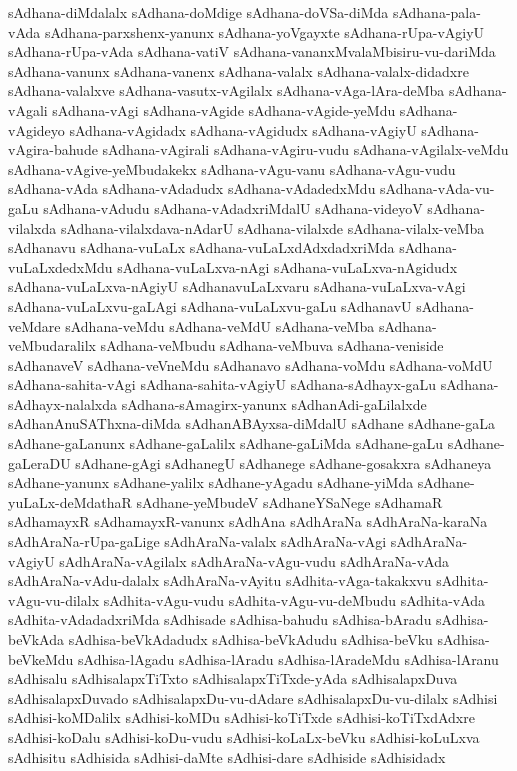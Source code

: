 {sAdhana-diMdalalx
sAdhana-doMdige
sAdhana-doVSa-diMda
sAdhana-pala-vAda
sAdhana-parxshenx-yanunx
sAdhana-yoVgayxte
sAdhana-rUpa-vAgiyU
sAdhana-rUpa-vAda
sAdhana-vatiV
sAdhana-vananxMvalaMbisiru-vu-dariMda
sAdhana-vanunx
sAdhana-vanenx
sAdhana-valalx
sAdhana-valalx-didadxre
sAdhana-valalxve
sAdhana-vasutx-vAgilalx
sAdhana-vAga-lAra-deMba
sAdhana-vAgali
sAdhana-vAgi
sAdhana-vAgide
sAdhana-vAgide-yeMdu
sAdhana-vAgideyo
sAdhana-vAgidadx
sAdhana-vAgidudx
sAdhana-vAgiyU
sAdhana-vAgira-bahude
sAdhana-vAgirali
sAdhana-vAgiru-vudu
sAdhana-vAgilalx-veMdu
sAdhana-vAgive-yeMbudakekx
sAdhana-vAgu-vanu
sAdhana-vAgu-vudu
sAdhana-vAda
sAdhana-vAdadudx
sAdhana-vAdadedxMdu
sAdhana-vAda-vu-gaLu
sAdhana-vAdudu
sAdhana-vAdadxriMdalU
sAdhana-videyoV
sAdhana-vilalxda
sAdhana-vilalxdava-nAdarU
sAdhana-vilalxde
sAdhana-vilalx-veMba
sAdhanavu
sAdhana-vuLaLx
sAdhana-vuLaLxdAdxdadxriMda
sAdhana-vuLaLxdedxMdu
sAdhana-vuLaLxva-nAgi
sAdhana-vuLaLxva-nAgidudx
sAdhana-vuLaLxva-nAgiyU
sAdhanavuLaLxvaru
sAdhana-vuLaLxva-vAgi
sAdhana-vuLaLxvu-gaLAgi
sAdhana-vuLaLxvu-gaLu
sAdhanavU
sAdhana-veMdare
sAdhana-veMdu
sAdhana-veMdU
sAdhana-veMba
sAdhana-veMbudaralilx
sAdhana-veMbudu
sAdhana-veMbuva
sAdhana-veniside
sAdhanaveV
sAdhana-veVneMdu
sAdhanavo
sAdhana-voMdu
sAdhana-voMdU
sAdhana-sahita-vAgi
sAdhana-sahita-vAgiyU
sAdhana-sAdhayx-gaLu
sAdhana-sAdhayx-nalalxda
sAdhana-sAmagirx-yanunx
sAdhanAdi-gaLilalxde
sAdhanAnuSAThxna-diMda
sAdhanABAyxsa-diMdalU
sAdhane
sAdhane-gaLa
sAdhane-gaLanunx
sAdhane-gaLalilx
sAdhane-gaLiMda
sAdhane-gaLu
sAdhane-gaLeraDU
sAdhane-gAgi
sAdhanegU
sAdhanege
sAdhane-gosakxra
sAdhaneya
sAdhane-yanunx
sAdhane-yalilx
sAdhane-yAgadu
sAdhane-yiMda
sAdhane-yuLaLx-deMdathaR
sAdhane-yeMbudeV
sAdhaneYSaNege
sAdhamaR
sAdhamayxR
sAdhamayxR-vanunx
sAdhAna
sAdhAraNa
sAdhAraNa-karaNa
sAdhAraNa-rUpa-gaLige
sAdhAraNa-valalx
sAdhAraNa-vAgi
sAdhAraNa-vAgiyU
sAdhAraNa-vAgilalx
sAdhAraNa-vAgu-vudu
sAdhAraNa-vAda
sAdhAraNa-vAdu-dalalx
sAdhAraNa-vAyitu
sAdhita-vAga-takakxvu
sAdhita-vAgu-vu-dilalx
sAdhita-vAgu-vudu
sAdhita-vAgu-vu-deMbudu
sAdhita-vAda
sAdhita-vAdadadxriMda
sAdhisade
sAdhisa-bahudu
sAdhisa-bAradu
sAdhisa-beVkAda
sAdhisa-beVkAdadudx
sAdhisa-beVkAdudu
sAdhisa-beVku
sAdhisa-beVkeMdu
sAdhisa-lAgadu
sAdhisa-lAradu
sAdhisa-lAradeMdu
sAdhisa-lAranu
sAdhisalu
sAdhisalapxTiTxto
sAdhisalapxTiTxde-yAda
sAdhisalapxDuva
sAdhisalapxDuvado
sAdhisalapxDu-vu-dAdare
sAdhisalapxDu-vu-dilalx
sAdhisi
sAdhisi-koMDalilx
sAdhisi-koMDu
sAdhisi-koTiTxde
sAdhisi-koTiTxdAdxre
sAdhisi-koDalu
sAdhisi-koDu-vudu
sAdhisi-koLaLx-beVku
sAdhisi-koLuLxva
sAdhisitu
sAdhisida
sAdhisi-daMte
sAdhisi-dare
sAdhiside
sAdhisidadx
}
